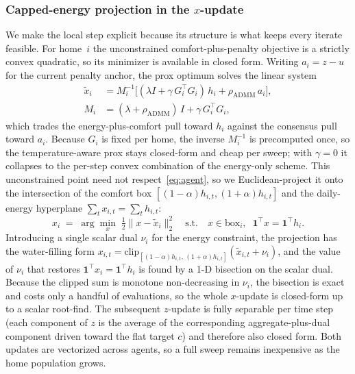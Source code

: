 \subsubsection{Capped-energy projection in the $x$-update}
We make the local step explicit because its structure is what keeps every iterate
feasible. For home~$i$ the unconstrained comfort-plus-penalty objective is a
strictly convex quadratic, so its minimizer is available in closed form.
Writing $a_i = z - u$ for the current penalty anchor, the prox optimum solves the
linear system
\begin{equation}
\begin{aligned}
\tilde{x}_i &= M_i^{-1}\big[(\lambda I + \gamma\,G_i^{\top}G_i)\,h_i
+ \rho_{\mathrm{ADMM}}\,a_i\big], \\
M_i &= (\lambda + \rho_{\mathrm{ADMM}})\,I + \gamma\,G_i^{\top}G_i,
\end{aligned}
\label{eq:prox}
\end{equation}
which trades the energy-plus-comfort pull toward $h_i$ against the consensus pull
toward $a_i$. Because $G_i$ is fixed per home, the inverse $M_i^{-1}$ is
precomputed once, so the temperature-aware prox stays closed-form and cheap per
sweep; with $\gamma = 0$ it collapses to the per-step convex combination of the
energy-only scheme. This unconstrained point need not respect~\eqref{eq:agent}, so we
Euclidean-project it onto the intersection of the comfort box
$[(1-\alpha)h_{i,t},(1+\alpha)h_{i,t}]$ and the daily-energy hyperplane
$\sum_t x_{i,t} = \sum_t h_{i,t}$:
\begin{equation}
x_i \;=\; \arg\min_{x}\;\tfrac12\lVert x - \tilde{x}_i\rVert_2^2
\quad\text{s.t.}\quad
x \in \text{box}_i,\;\; \mathbf{1}^{\top}x = \mathbf{1}^{\top}h_i .
\label{eq:proj}
\end{equation}
Introducing a single scalar dual $\nu_i$ for the energy constraint, the projection
has the water-filling form
$x_{i,t} = \mathrm{clip}_{[(1-\alpha)h_{i,t},\,(1+\alpha)h_{i,t}]}(\tilde{x}_{i,t} + \nu_i)$,
and the value of $\nu_i$ that restores $\mathbf{1}^{\top}x_i = \mathbf{1}^{\top}h_i$
is found by a 1-D bisection on the scalar dual. Because the clipped sum is
monotone non-decreasing in $\nu_i$, the bisection is exact and costs only a handful
of evaluations, so the whole $x$-update is closed-form up to a scalar root-find.
The subsequent $z$-update is fully separable per time step (each component of
$z$ is the average of the corresponding aggregate-plus-dual component driven toward
the flat target $c$) and therefore also closed form. Both updates are
vectorized across agents, so a full sweep remains inexpensive as the home
population grows.

